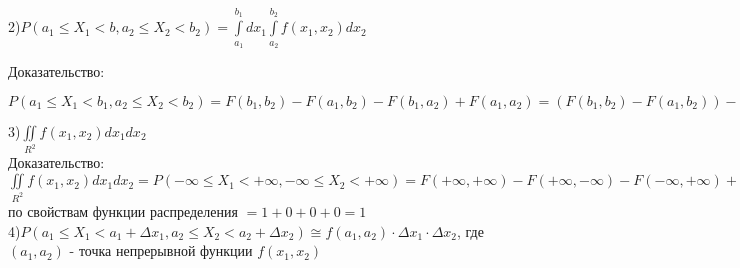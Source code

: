 2)$P(a_{1} \leqslant X_{1} < b, a_{2} \leqslant X_{2} < b_{2}) = \int\limits^{b_{1}}_{a_{1}} dx_{1} \int\limits^{b_{2}}_{a_{2}} f(x_{1}, x_{2}) dx_{2}$

Доказательство:\\
$P(a_{1} \leqslant X_{1} < b_{1}, a_{2} \leqslant X_{2} < b_{2}) =F(b_{1}, b_{2}) - F(a_{1}, b_{2}) - F(b_{1}, a_{2}) + F(a_{1}, a_{2}) = (F(b_{1}, b_{2}) - F(a_{1}, b_{2})) - (F(b_{1}, a_{2}) - F(a_{1}, a_{2})) = \int\limits^{b_{1}}_{a_{1}} dx_{1} \int\limits^{b_{2}}_{a_{2}} f(x_{1}, x_{2}) dx_{2}$\\

3)$\iint\limits_{R^{2}} f(x_{1}, x_{2}) dx_{1} dx_{2}$\\

Доказательство:\\
$\iint\limits_{R^{2}} f(x_{1}, x_{2}) dx_{1} dx_{2} = P(-\infty \leqslant X_{1} < +\infty , -\infty \leqslant X_{2} < +\infty) = F(+\infty, +\infty) - F(+\infty, -\infty)  - F(-\infty, +\infty) + F(-\infty, -\infty) = $ по свойствам функции распределения $ = 1 + 0 + 0 + 0 = 1$\\

4)$P(a_{1} \leqslant X_{1} < a_{1} + \Delta x_{1}, a_{2} \leqslant X_{2} < a_{2} + \Delta x_{2}) \cong f(a_{1}, a_{2}) \cdot \Delta x_{1} \cdot \Delta x_{2}$, где $(a_{1}, a_{2})$ - точка непрерывной функции $f(x_{1}, x_{2})$\\

